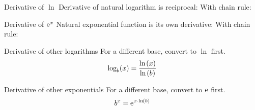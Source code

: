 \begin{multicols}{2}
 \begin{FormulaBox}{Derivative of $\ln$}
  Derivative of natural logarithm is reciprocal:
  \WithSymbolDefs{
   \[ \D{\big.\LN{\X}} = \frac{1}{\X} \]
  }
  \bigskip
  With chain rule:
  \WithSymbolDefs{
   \[
    \D{\big.\LN{\W}}
    = \pfrac{1}{\W} \cdot \Deriv{\W}{\X}
   \]
  }
  \WithWordDefs{
   \[
    \D{\big.\LN{\W}}
    = \pfrac{1}{\W} \cdot \D{\W}
   \]
  }
 \end{FormulaBox}
 \begin{FormulaBox}{Derivative of $\mathrm{e}^x$}
  Natural exponential function is its own derivative:
  \WithSymbolDefs{
   \[ \D{\big.\me^{\X}} = \me^{\X} \]
  }
  \bigskip
  With chain rule:
  \WithSymbolDefs{
   \[
    \D{\big.\me^{\W}}
    = \me^{\W} \cdot \D{\W}
   \]
  }
  \WithWordDefs{
   \[
    \D{\me^{\W}}
    = \me^{\W} \cdot \D{\W}
   \]
  }
 \end{FormulaBox}
 \begin{FormulaBox}{Derivative of other logarithms}
  For a different base, convert to $\ln$ first.
  \begin{equation*}
   \log_b (x) = \frac{\mathrm{ln}\hspace{-0.1ex}\left(x\right)}{\mathrm{ln}\hspace{-0.1ex}\left(b\right)}
  \end{equation*}
  \WithSymbolDefs{
   \[
    \D{\big.\log_b(\X)} = \frac{1}{\LN{b} \cdot \X}
   \]
  }
 \end{FormulaBox}
 \begin{FormulaBox}{Derivative of other exponentials}
  For a different base, convert to $\mathrm{e}$ first.
  \begin{equation*}
   b^x = \mathrm{e}^{x \cdot \mathrm{ln}\hspace{-0.1ex}\left(b\right)}
  \end{equation*}
  \WithSymbolDefs{
   \[
    \D{b^\X} = \LN{b} \cdot \me^{\X \cdot \LN{b}} = \LN{b} \cdot b^\X
   \]
  }
 \end{FormulaBox}
\end{multicols}

